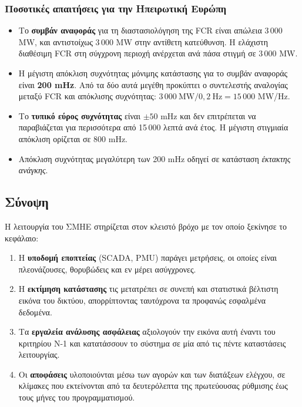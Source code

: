 \subsubsection*{Ποσοτικές απαιτήσεις για την Ηπειρωτική Ευρώπη}

\begin{itemize}
\item Το \textbf{συμβάν αναφοράς} για τη διαστασιολόγηση της FCR είναι απώλεια 3\,000 MW,
      και αντιστοίχως 3\,000 MW στην αντίθετη κατεύθυνση. Η ελάχιστη διαθέσιμη FCR στη
      σύγχρονη περιοχή ανέρχεται ανά πάσα στιγμή σε 3\,000 MW.
\item Η μέγιστη απόκλιση συχνότητας μόνιμης κατάστασης για το συμβάν αναφοράς είναι
      \textbf{200 mHz}. Από τα δύο αυτά μεγέθη προκύπτει ο συντελεστής αναλογίας μεταξύ FCR
      και απόκλισης συχνότητας: $3\,000\ \text{MW} / 0{,}2\ \text{Hz} = 15\,000$ MW/Hz.
\item Το \textbf{τυπικό εύρος συχνότητας} είναι $\pm 50$ mHz και δεν επιτρέπεται να
      παραβιάζεται για περισσότερα από 15\,000 λεπτά ανά έτος. Η μέγιστη στιγμιαία απόκλιση
      ορίζεται σε 800 mHz.
\item Απόκλιση συχνότητας μεγαλύτερη των 200 mHz οδηγεί σε κατάσταση \emph{έκτακτης
      ανάγκης}.
\end{itemize}

\subsection{Σύνοψη}

Η λειτουργία του ΣΜΗΕ στηρίζεται στον κλειστό βρόχο με τον οποίο ξεκίνησε το κεφάλαιο:

\begin{enumerate}
\item Η \textbf{υποδομή εποπτείας} (SCADA, PMU) παράγει μετρήσεις, οι οποίες είναι
      πλεονάζουσες, θορυβώδεις και εν μέρει ασύγχρονες.
\item Η \textbf{εκτίμηση κατάστασης} τις μετατρέπει σε συνεπή και στατιστικά βέλτιστη
      εικόνα του δικτύου, απορρίπτοντας ταυτόχρονα τα προφανώς εσφαλμένα δεδομένα.
\item Τα \textbf{εργαλεία ανάλυσης ασφάλειας} αξιολογούν την εικόνα αυτή έναντι του
      κριτηρίου N-1 και κατατάσσουν το σύστημα σε μία από τις πέντε καταστάσεις λειτουργίας.
\item Οι \textbf{αποφάσεις} υλοποιούνται μέσω των αγορών και των διατάξεων ελέγχου, σε
      κλίμακες που εκτείνονται από τα δευτερόλεπτα της πρωτεύουσας ρύθμισης έως τους μήνες
      του προγραμματισμού.
\end{enumerate}

